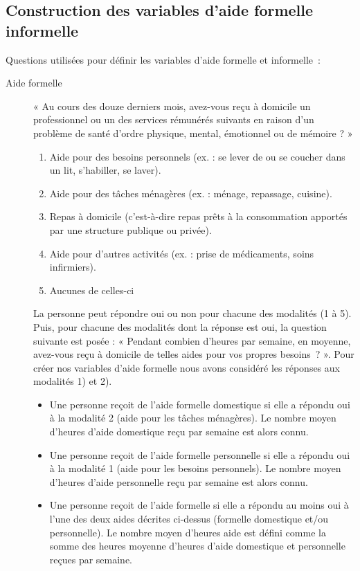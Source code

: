 \begin{Article}
\begin{refsection}[Bonnal]
\begin{appendices}

\section{Construction des variables d’aide formelle informelle}
\label{Construction des variables d’aide formelle informelle}

Questions utilisées pour définir les variables d’aide formelle et informelle~:

\begin{description}
\item[Aide formelle] « Au cours des douze derniers mois, avez-vous reçu à domicile un professionnel ou un des services rémunérés suivants en raison d’un problème de santé d’ordre physique, mental, émotionnel ou de mémoire ? »
\begin{enumerate}
\item Aide pour des besoins personnels (ex. : se lever de ou se coucher dans un lit, s'habiller, se laver).
\item Aide pour des tâches ménagères (ex. : ménage, repassage, cuisine).
\item Repas à domicile (c'est-à-dire repas prêts à la consommation apportés par une structure publique ou privée).
\item Aide pour d'autres activités (ex. : prise de médicaments, soins infirmiers).
\item Aucunes de celles-ci
\end{enumerate}

La personne peut répondre oui ou non pour chacune des modalités (1 à 5). Puis, pour chacune des modalités dont la réponse est oui, la question suivante est posée : « Pendant combien d’heures par semaine, en moyenne, avez-vous reçu à domicile de telles aides pour vos propres besoins~? ».
Pour créer nos variables d’aide formelle nous avons considéré les réponses aux modalités 1) et 2).
\begin{itemize}
\item Une personne reçoit de l’aide formelle domestique si elle a répondu oui à la modalité 2 (aide pour les tâches ménagères). Le nombre moyen d’heures d’aide domestique reçu par semaine est alors connu.
\item Une personne reçoit de l’aide formelle personnelle si elle a répondu oui à la modalité 1 (aide pour les besoins personnels). Le nombre moyen d’heures d’aide personnelle reçu par semaine est alors connu.
\item Une personne reçoit de l’aide formelle si elle a répondu au moins oui à l’une des deux aides décrites ci-dessus (formelle domestique et/ou personnelle). Le nombre moyen d’heures aide est défini comme la somme des heures moyenne d’heures d’aide domestique et personnelle reçues par semaine.
\end{itemize}


\end{description}
\end{appendices}
\end{refsection}
\end{Article}
